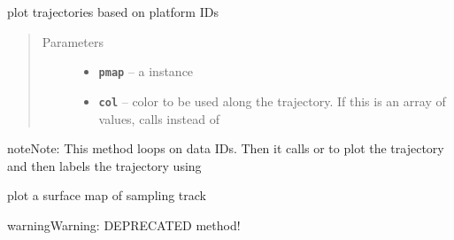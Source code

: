 \documentclass[letterpaper,10pt,english]{sphinxmanual}
\begin{document}
\begin{fulllineitems}
\begin{fulllineitems}
\end{fulllineitems}


\begin{fulllineitems}
\label{altimetry.data:altimetry.data.hydro_data.plot_track}
plot trajectories based on platform IDs
\begin{quote}\begin{description}
\item[{Parameters}] \leavevmode\begin{itemize}
\item {} 
\textbf{\texttt{pmap}} -- a  instance

\item {} 
\textbf{\texttt{col}} -- color to be used along the trajectory. If this is an array of values, calls  instead of 

\end{itemize}

\end{description}\end{quote}

\begin{notice}{note}{Note:}
This method loops on data IDs. Then it calls  or  to plot the trajectory and then labels the trajectory using 
\end{notice}

\end{fulllineitems}


\begin{fulllineitems}
\label{altimetry.data:altimetry.data.hydro_data.plot_track_old}
plot a surface map of sampling track

\begin{notice}{warning}{Warning:}
DEPRECATED method!
\end{notice}


\end{fulllineitems}
\end{fulllineitems}
\end{document}
